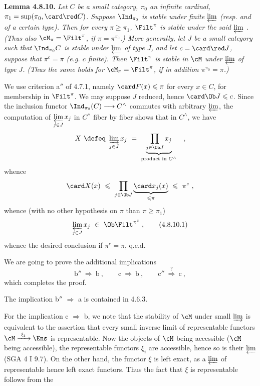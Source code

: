 
\textbf{Lemma 4.8.10.} \textit{Let $C$ be a small category, $\pi_0$ an infinite cardinal, $\pi_1 = \sup(\pi_0, \card\red C)$. Suppose $\Ind_{\pi_0}$ is stable under finite $\varprojlim$ (resp. and of a certain type). Then for every $\pi \geqslant \pi_1$, $\Filt^{\pi}$ is stable under the said $\varprojlim$ . (Thus also $\cM_{\pi} = \Filt^{\pi}$, if $\pi = \pi^{\pi_0}$.) More} %
\textit{generally, let $J$ be a small category such that $\Ind_{\pi_0}C$ is stable under $\varprojlim$ of type $J$, and let $c = \card\red J$, suppose that $\pi^{c} = \pi$ (e.g. $c$ finite). Then $\Filt^{\pi}$ is stable in $\cM$ under $\varprojlim$ of type $J$. (Thus the same holds for $\cM_{\pi} = \Filt^{\pi}$, if in addition $\pi^{\pi_0} = \pi$.)}

We use criterion a$''$ of 4.7.1, namely $\card F(x) \leqslant \pi$ for every $x \in C$, for membership in $\Filt^{\pi}$. We may suppose $J$ reduced, hence $\card\Ob J \leqslant c$. Since the inclusion functor $\Ind_{\pi_0}(C) \longrightarrow C^{\wedge}$ commutes with arbitrary $\varprojlim$, the computation of $\varprojlim\limits_{j\in J} x_j$ in $C^{\wedge}$ fiber by fiber shows that in $C^{\wedge}$, we have
\[
X \ \defeq\ \varinjlim_{j\in J} x_j \ = \ \underbrace{\prod_{j\in\Ob J} x_j}_{\text{product in } C^{\wedge}} \quad ,
\] %
whence
\[
\card X(x) \ \leqslant\ \prod_{j\in\Ob J} \underbrace{\card x_j(x)}_{\leqslant\pi} \ \leqslant\ \pi^{c}\ ,
\]
whence (with no other hypothesis on $\pi$ than $\pi \geqslant \pi_1$)
\[
\varprojlim_{j\in J} x_j \ \in\ \Ob\Filt^{\pi^{c}}\ , \tag*{(4.8.10.1)}
\]
whence the desired conclusion if $\pi^{c} = \pi$, q.e.d.


We are going to prove the additional implications
\[
\text{b}'' \ \Longrightarrow\ \text{b}\ , \qquad \text{c} \ \Longrightarrow\ \text{b}\ , \qquad \text{c}'' \ \overset{?}{\Longrightarrow}\ \text{c}\ ,
\]
which completes the proof.

The implication b$''$ $\Longrightarrow$ a is contained in 4.6.3.

For the implication c $\Longrightarrow$ b, we note that the stability of $\cM$ under small $\varinjlim$ is equivalent to the assertion that every small inverse limit of representable functors $\cM \xrightarrow{\ \xi_i\ } \Ens$ is representable. Now the objects of $\cM$ being accessible ($\cM$ being accessible), the representable functors $\xi_i$ are accessible, hence so is their $\varprojlim$ (SGA 4 I 9.7). On the other hand, the functor $\xi$ is left exact, as a $\varprojlim$ of representable hence left exact functors. Thus the fact that $\xi$ is representable follows from the %

